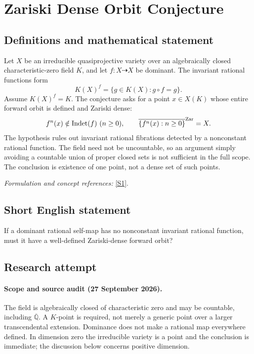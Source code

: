 \documentclass[11pt]{article}
\begin{document}
\section*{\texorpdfstring{Zariski Dense Orbit Conjecture}{Zariski Dense Orbit Conjecture}}\label{30006963}
\subsection{Definitions and mathematical statement}
Let $X$ be an irreducible quasiprojective variety over an algebraically closed characteristic-zero field $K$, and let $f:X\dashrightarrow X$ be dominant. The invariant rational functions form
\[
 K(X)^f=\{g\in K(X):g\circ f=g\}.
\]
Assume $K(X)^f=K$. The conjecture asks for a point $x\in X(K)$ whose entire forward orbit is defined and Zariski dense:
\[
 f^n(x)\notin\operatorname{Indet}(f)\ (n\ge0),
 \qquad\overline{\{f^n(x):n\ge0\}}^{\rm Zar}=X.
\]
The hypothesis rules out invariant rational fibrations detected by a nonconstant rational function. The field need not be uncountable, so an argument simply avoiding a countable union of proper closed sets is not sufficient in the full scope. The conclusion is existence of one point, not a dense set of such points.
\par\smallskip\textit{Formulation and concept references:} \href{https://personal.math.ubc.ca/~dghioca/papers/conjecture_automorphisms.pdf}{[S1]}.

\subsection{Short English statement}
If a dominant rational self-map has no nonconstant invariant rational function, must it have a well-defined Zariski-dense forward orbit?
\subsection{Research attempt}

\paragraph{Scope and source audit (27 September 2026).}
The field is algebraically closed of characteristic zero and may be
countable, including $\overline{\mathbb Q}$. A $K$-point is required, not
merely a generic point over a larger transcendental extension. Dominance
does not make a rational map everywhere defined. In dimension zero the
irreducible variety is a point and the conclusion is immediate; the
discussion below concerns positive dimension.
\end{document}
